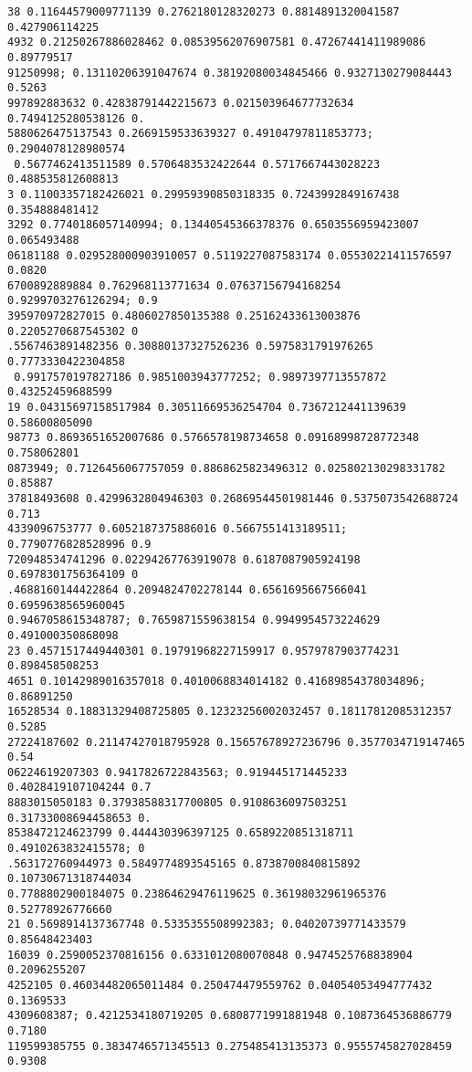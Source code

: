\documentclass[12pt,a4paper]{article}
\begin{document}
\begin{lstlisting}
38 0.11644579009771139 0.2762180128320273 0.8814891320041587 0.427906114225
4932 0.21250267886028462 0.08539562076907581 0.47267441411989086 0.89779517
91250998; 0.13110206391047674 0.38192080034845466 0.9327130279084443 0.5263
997892883632 0.42838791442215673 0.021503964677732634 0.7494125280538126 0.
5880626475137543 0.2669159533639327 0.49104797811853773; 0.2904078128980574
 0.5677462413511589 0.5706483532422644 0.5717667443028223 0.488535812608813
3 0.11003357182426021 0.29959390850318335 0.7243992849167438 0.354888481412
3292 0.7740186057140994; 0.13440545366378376 0.6503556959423007 0.065493488
06181188 0.029528000903910057 0.5119227087583174 0.05530221411576597 0.0820
6700892889884 0.762968113771634 0.07637156794168254 0.9299703276126294; 0.9
395970972827015 0.4806027850135388 0.25162433613003876 0.2205270687545302 0
.5567463891482356 0.30880137327526236 0.5975831791976265 0.7773330422304858
 0.9917570197827186 0.9851003943777252; 0.9897397713557872 0.43252459688599
19 0.04315697158517984 0.30511669536254704 0.7367212441139639 0.58600805090
98773 0.8693651652007686 0.5766578198734658 0.09168998728772348 0.758062801
0873949; 0.7126456067757059 0.8868625823496312 0.025802130298331782 0.85887
37818493608 0.4299632804946303 0.26869544501981446 0.5375073542688724 0.713
4339096753777 0.6052187375886016 0.5667551413189511; 0.7790776828528996 0.9
720948534741296 0.02294267763919078 0.6187087905924198 0.6978301756364109 0
.4688160144422864 0.2094824702278144 0.6561695667566041 0.6959638565960045 
0.9467058615348787; 0.7659871559638154 0.9949954573224629 0.491000350868098
23 0.4571517449440301 0.19791968227159917 0.9579787903774231 0.898458508253
4651 0.10142989016357018 0.4010068834014182 0.41689854378034896; 0.86891250
16528534 0.18831329408725805 0.12323256002032457 0.18117812085312357 0.5285
27224187602 0.21147427018795928 0.15657678927236796 0.3577034719147465 0.54
06224619207303 0.9417826722843563; 0.919445171445233 0.4028419107104244 0.7
8883015050183 0.37938588317700805 0.9108636097503251 0.31733008694458653 0.
8538472124623799 0.444430396397125 0.6589220851318711 0.4910263832415578; 0
.563172760944973 0.5849774893545165 0.8738700840815892 0.10730671318744034 
0.7788802900184075 0.23864629476119625 0.36198032961965376 0.52778926776660
21 0.5698914137367748 0.5335355508992383; 0.04020739771433579 0.85648423403
16039 0.2590052370816156 0.6331012080070848 0.9474525768838904 0.2096255207
4252105 0.46034482065011484 0.250474479559762 0.04054053494777432 0.1369533
4309608387; 0.4212534180719205 0.6808771991881948 0.1087364536886779 0.7180
119599385755 0.3834746571345513 0.275485413135373 0.9555745827028459 0.9308

\end{lstlisting}
\end{document}
